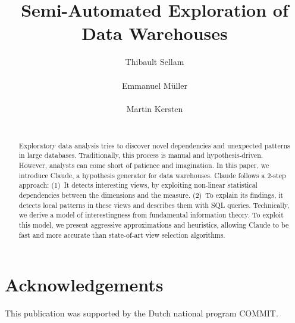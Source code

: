 \documentclass{sig-alternate-2013}
\begin{document}
\title{Semi-Automated Exploration of Data Warehouses}


\author{
\alignauthor
Thibault Sellam\\
       \\
\alignauthor
Emmanuel M\"uller\\
    \\
\alignauthor
Martin Kersten\\
       \\
}

\maketitle

\begin{abstract}
Exploratory data analysis tries to discover novel dependencies and unexpected
patterns in large databases. Traditional\-ly, this process is manual and
hypothesis-driven. However, analysts can come short of patience and
imagination. In this paper, we introduce Claude, a hypothesis generator for
data warehouses. Claude follows a 2-step approach: (1)~It detects interesting
views, by exploiting non-linear statistical dependencies between the dimensions
and the measure. (2)~To explain its findings, it detects local patterns in
these views and describes them with SQL queries.  Technically, we derive a
model of interestingness from fundamental information theory. To exploit this
model, we present aggressive approximations and heuristics, allowing Claude to
be fast and more accurate than state-of-art view selection algorithms. 
\end{abstract}





\section{Acknowledgements}
This publication was supported by the Dutch national program COMMIT.


{ \small   
}
\end{document}
